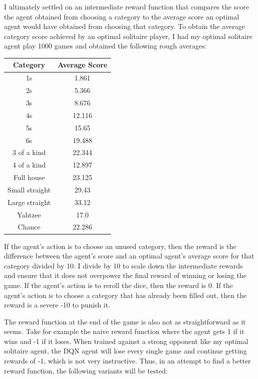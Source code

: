 \documentclass[12pt]{article}
\begin{document}
I ultimately settled on an intermediate reward function that compares the score the agent obtained from choosing a category to the average score an optimal agent would have obtained from choosing that category. To obtain the average category score achieved by an optimal solitaire player, I had my optimal solitaire agent play 1000 games and obtained the following rough averages:

\begin{center}
    \begin{tabular}{ |c|c| }
        \hline
        Category & Average Score \\
        \hline
        1s & 1.861 \\
        2s & 5.366 \\
        3s & 8.676 \\
        4s & 12.116 \\
        5s & 15.65 \\
        6s & 19.488 \\
        3 of a kind & 22.344 \\
        4 of a kind & 12.897 \\
        Full house & 23.125 \\
        Small straight & 29.43 \\
        Large straight & 33.12 \\
        Yahtzee & 17.0 \\
        Chance & 22.286 \\
        \hline
    \end{tabular}
\end{center} 

\noindent
If the agent's action is to choose an unused category, then the reward is the difference between the agent's score and an optimal agent's average score for that category divided by 10. I divide by 10 to scale down the intermediate rewards and ensure that it does not overpower the final reward of winning or losing the game. If the agent's action is to reroll the dice, then the reward is 0. If the agent's action is to choose a category that has already been filled out, then the reward is a severe -10 to punish it.

The reward function at the end of the game is also not as straightforward as it seems. Take for example the naive reward function where the agent gets 1 if it wins and -1 if it loses. When trained against a strong opponent like my optimal solitaire agent, the DQN agent will lose every single game and continue getting rewards of -1, which is not very instructive. Thus, in an attempt to find a better reward function, the following variants will be tested:
\end{document}
